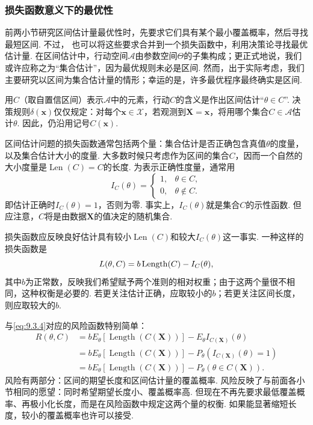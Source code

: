 \subsubsection{损失函数意义下的最优性}\label{sec:9.3.4}
前两小节研究区间估计量最优性时，先要求它们具有某个最小覆盖概率，然后寻找最短区间. 不过，
也可以将这些要求合并到一个损失函数中，利用决策论寻找最优估计量. 在区间估计中，行动空间$\mathcal A$由参数空间$\Theta$的子集构成；更正式地说，我们或许应称之为“集合估计”，因为最优规则未必是区间. 然而，出于实际考虑，我们主要研究以区间为集合估计量的情形；幸运的是，许多最优程序最终确实是区间.

用$C$（取自置信区间）表示$\mathcal A$中的元素，行动$C$的含义是作出区间估计“$\theta\in C$\mbox{”.} 决策规则$\delta(\boldsymbol x)$仅仅规定：对每个$\boldsymbol x\in\mathcal X$，若观测到$\boldsymbol X=\boldsymbol x$，将用哪个集合$C\in\mathcal A$估计$\theta$. 因此，仍沿用记号$C(\boldsymbol x)$.

区间估计问题的损失函数通常包括两个量：集合估计是否正确包含真值$\theta$的度量，以及集合估计大小的度量. 大多数时候只考虑作为区间的集合$C$，因而一个自然的大小度量是$\operatorname{Len}(C)=C\text{的长度}$. 为表示正确性度量，通常用
$$I_C(\theta)=\begin{cases}1,&\theta\in C,\\0,&\theta\notin C.\end{cases}$$
即估计正确时$I_C(\theta)=1$，否则为零. 事实上，$I_C(\theta)$就是集合$C$的示性函数. 但应注意，$C$将是由数据$\boldsymbol X$的值决定的随机集合.

损失函数应反映良好估计具有较小$\operatorname{Len}(C)$和较大$I_C(\theta)$这一事实. 一种这样的损失函数是
\begin{equation}\label{eq:9.3.4}\index{SI0146@决策论}\index{SI0657@区间估计}
L(\theta,C)=b\operatorname{Length}(C)-I_C(\theta),
\end{equation}
其中$b$为正常数，反映我们希望赋予两个准则的相对权重；由于这两个量很不相同，这种权衡是必要的. 若更关注估计正确，应取较小的$b$；若更关注区间长度，则应取较大的$b$.

与\eqref{eq:9.3.4}对应的风险函数特别简单：
$$\begin{aligned}
R(\theta,C)&=bE_\theta[\operatorname{Length}(C(\boldsymbol X))]-E_\theta I_{C(\boldsymbol X)}(\theta)\\
&=bE_\theta[\operatorname{Length}(C(\boldsymbol X))]-P_\theta(I_{C(\boldsymbol X)}(\theta)=1)\\
&=bE_\theta[\operatorname{Length}(C(\boldsymbol X))]-P_\theta(\theta\in C(\boldsymbol X)).
\end{aligned}$$
风险有两部分：区间的期望长度和区间估计量的覆盖概率. 风险反映了与前面各小节相同的愿望：同时希望期望长度小、覆盖概率高. 但现在不再先要求最低覆盖概率、再极小化长度，而是在风险函数中规定这两个量的权衡. 如果能显著缩短长度，较小的覆盖概率也许可以接受.

